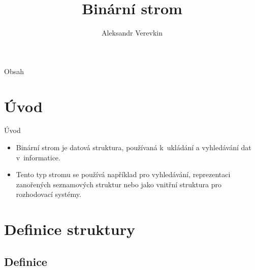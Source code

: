 \documentclass[hyperref={unicode}]{beamer}
\title{Binární strom}
\author{Aleksandr Verevkin}
\institute{Vysoké učení technické v~Brně\\
Fakulta informačních technologií}
\begin{document}
\begin{frame}
  \titlepage
\end{frame}


\begin{frame}{Obsah}
  \tableofcontents
\end{frame}

\section{Úvod}

\begin{frame}{Úvod}

\begin{itemize}
  \item Binární strom je datová struktura,
  používaná k~ukládání a vyhledávání dat v~informatice.
  \pause
  \item Tento typ stromu se používá například pro vyhledávání, reprezentaci zanořených
  seznamových struktur nebo jako vnitřní struktura pro rozhodovací systémy.
\end{itemize}

\end{frame}

\section{Definice struktury}

\subsection{Definice}
\end{document}
